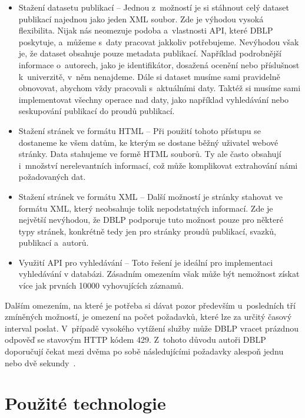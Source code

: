 \documentclass[
  biblatex,
  sourcecodes,
  glossaries,
  index
]{kidiplom}
\begin{document}
\begin{itemize}
\item Stažení datasetu publikací -- Jednou z~možností je si stáhnout celý dataset publikací najednou jako jeden XML soubor. Zde je výhodou vysoká flexibilita. Nijak nás neomezuje podoba a~vlastnosti API, které DBLP poskytuje, a~můžeme s~daty pracovat jakkoliv potřebujeme. Nevýhodou však je, že dataset obsahuje pouze metadata publikací. Například podrobnější informace o~autorech, jako je identifikátor, dosažená ocenění nebo příslušnost k~univerzitě, v~něm nenajdeme. Dále si dataset musíme sami pravidelně obnovovat, abychom vždy pracovali s~aktuálními daty. Taktéž si musíme sami implementovat všechny operace nad daty, jako například vyhledávání nebo seskupování publikací do proudů publikací.
\item Stažení stránek ve formátu HTML -- Při použití tohoto přístupu se dostaneme ke všem datům, ke kterým se dostane běžný uživatel webové stránky. Data stahujeme ve formě HTML souborů. Ty ale často obsahují i~množství nerelevantních informací, což může komplikovat extrahování námi požadovaných dat.
\item Stažení stránek ve formátu XML -- Další možností je stránky stahovat ve formátu XML, který neobsahuje tolik nepodstatných informací. Zde je největší nevýhodou, že DBLP podporuje tuto možnost pouze pro některé typy stránek, konkrétně tedy jen pro stránky proudů publikací, svazků, publikací a~autorů.
\item Využití API pro vyhledávání -- Toto řešení je ideální pro implementaci vyhledávání v databázi. Zásadním omezením však může být nemožnost získat více jak prvních 10000 vyhovujících záznamů.
\end{itemize}

Dalším omezením, na které je potřeba si dávat pozor především u~posledních tří zmíněných možností, je omezení na počet požadavků, které lze za určitý časový interval poslat. V~případě vysokého vytížení služby může DBLP vracet prázdnou odpověď se stavovým HTTP kódem 429. Z~tohoto důvodu autoři DBLP doporučují čekat mezi dvěma po sobě následujícími požadavky alespoň jednu nebo dvě sekundy~\cite{t12}.


\newpage

\section{Použité technologie}
\end{document}
